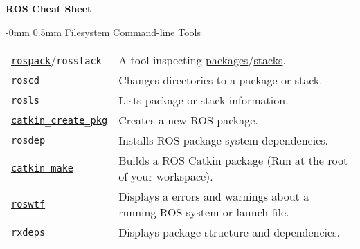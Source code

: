 \documentclass[10pt,landscape]{article}
\makeatletter
\renewcommand{\section}{\@startsection{section}{1}{0mm}%
                                {-0mm} %
                                {0.5mm}%
                                {\normalfont\large\bfseries}}
\makeatother
\begin{document}
\raggedright
\footnotesize
\begin{multicols}{3}


\setlength{\premulticols}{1pt}
\setlength{\postmulticols}{1pt}
\setlength{\multicolsep}{1pt}
\setlength{\columnsep}{2pt}

\begin{center}
     \Large{\textbf{ROS Cheat Sheet}} \\
\end{center}
\newlength{\MyLen}


\section{Filesystem Command-line Tools}
\vspace{1.5mm}
\begin{tabular}{@{}p{\the\MyLen}%
                @{}p{\linewidth-\the\MyLen}@{}}
\texttt{\href{http://www.ros.org/wiki/rospack}{rospack}}/\texttt{rosstack} & A tool inspecting \href{http://www.ros.org/wiki/Packages}{packages}/\href{http://www.ros.org/wiki/Stack}{stacks}. \\
\texttt{roscd} & Changes directories to a package or stack. \\
\texttt{rosls} & Lists package or stack information. \\
\texttt{\href{http://www.ros.org/wiki/catkin}{catkin\_create\_pkg}} & Creates a new ROS package. \\
\texttt{\href{http://www.ros.org/wiki/rosdep}{rosdep}} & Installs ROS package system dependencies.\\
\texttt{\href{http://www.ros.org/wiki/catkin}{catkin\_make}} & Builds a ROS Catkin package (Run at the root of your workspace).\\
\texttt{\href{http://www.ros.org/wiki/roswtf}{roswtf}} & Displays a errors and warnings about a running ROS system or launch file.\\
\texttt{\href{http://www.ros.org/wiki/rxdeps}{rxdeps}} & Displays package structure and dependencies.\\
\end{tabular}


\end{multicols}
\end{document}
